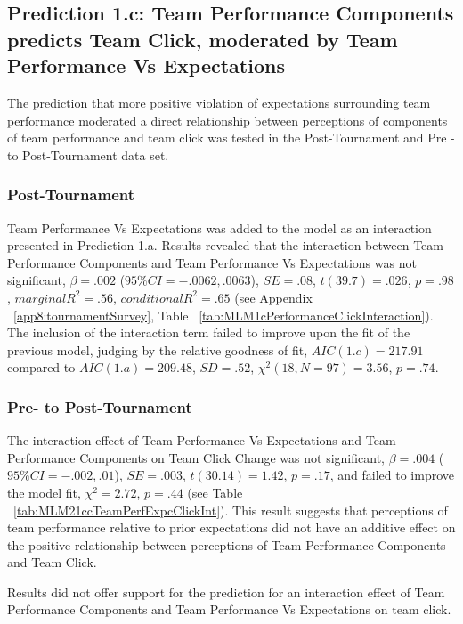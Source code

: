 \begin{CJK}{UTF8}{gbsn}
\subsection{Prediction 1.c: Team Performance Components predicts Team Click, moderated by Team Performance Vs Expectations\label{sect:Prediction1c}}

The prediction that more positive violation of expectations surrounding team performance moderated a direct relationship between perceptions of components of team performance and team click was tested in the Post-Tournament and Pre - to Post-Tournament data set.

  \subsubsection{Post-Tournament}
Team Performance Vs Expectations was added to the model as an interaction presented in Prediction 1.a. Results revealed that the interaction between Team Performance Components and Team Performance Vs Expectations was not significant, $\beta = .002$ ($95\% CI =  -.0062, .0063$), $SE = .08$, $t(39.7) = .026$, $p = .98$, $marginal R^2 = .56$, $conditional R^2 = .65$ (see Appendix ~\ref{app8:tournamentSurvey}, Table ~\ref{tab:MLM1cPerformanceClickInteraction}).  The inclusion of the interaction term failed to improve upon the fit of the previous model, judging by the relative goodness of fit, $AIC(1.c) = 217.91$ compared to $AIC(1.a) = 209.48$, $SD = .52 $, $\chi^2(18, N = 97) = 3.56$, $ p =.74$.

\subsubsection{Pre- to Post-Tournament}
The interaction effect of Team Performance Vs Expectations and Team Performance Components on Team Click Change was not significant, $\beta = .004$ ($95\% CI =  -.002, .01$), $SE = .003$, $t(30.14) = 1.42$, $p = .17$, and failed to improve the model fit, $\chi^2 = 2.72$, $ p = .44$ (see Table ~\ref{tab:MLM21ccTeamPerfExpcClickInt}).  This result suggests that perceptions of team performance relative to prior expectations did not have an additive effect on the positive relationship between perceptions of Team Performance Components and Team Click.

Results did not offer support for the prediction for an interaction effect of Team Performance Components and Team Performance Vs Expectations on team click.







\end{CJK}
